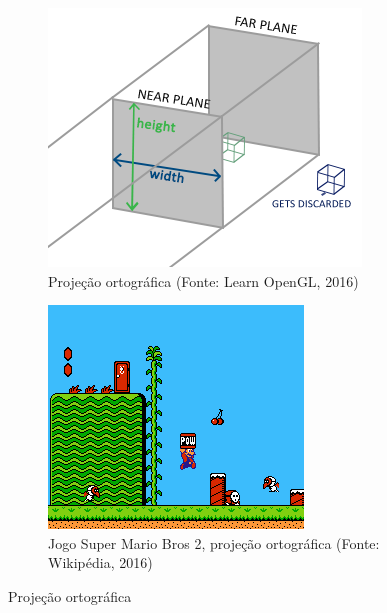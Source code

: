 \begin{figure}[H]
	\begin{subfigure}[b]{0.4\textwidth}
		\includegraphics[width=\textwidth]{imagens/orthographic_frustum.png}
		\caption[Projeção ortográfica]{Projeção ortográfica (Fonte: Learn OpenGL, 2016)}
		\label{fig:ortofrustum}
	\end{subfigure}
	\hfill
	\begin{subfigure}[b]{0.4\textwidth}
		\includegraphics[width=\textwidth]{imagens/mariobros2.png}
		\caption[Jogo Super Mario Bros 2, projeção ortográfica]{Jogo Super Mario Bros 2, projeção ortográfica (Fonte: Wikipédia, 2016)}
		\label{fig:mariobros2}
	\end{subfigure}
	\caption{Projeção ortográfica}
\end{figure}

